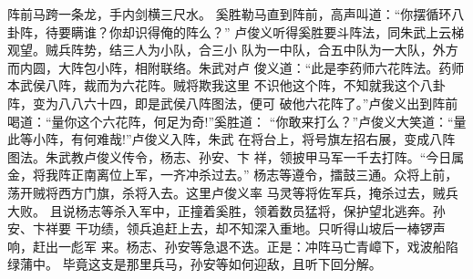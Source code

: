 阵前马跨一条龙，手内剑横三尺水。
奚胜勒马直到阵前，高声叫道：“你摆循环八卦阵，待要瞒谁？你却识得俺的阵么？”
卢俊义听得奚胜要斗阵法，同朱武上云梯观望。贼兵阵势，结三人为小队，合三小
队为一中队，合五中队为一大队，外方而内圆，大阵包小阵，相附联络。朱武对卢
俊义道：“此是李药师六花阵法。药师本武侯八阵，裁而为六花阵。贼将欺我这里
不识他这个阵，不知就我这个八卦阵，变为八八六十四，即是武侯八阵图法，便可
破他六花阵了。”卢俊义出到阵前喝道：“量你这个六花阵，何足为奇!”奚胜道：
“你敢来打么？”卢俊义大笑道：“量此等小阵，有何难哉!”卢俊义入阵，朱武
在将台上，将号旗左招右展，变成八阵图法。朱武教卢俊义传令，杨志、孙安、卞
祥，领披甲马军一千去打阵。“今日属金，将我阵正南离位上军，一齐冲杀过去。”
杨志等遵令，擂鼓三通。众将上前，荡开贼将西方门旗，杀将入去。这里卢俊义率
马灵等将佐军兵，掩杀过去，贼兵大败。
且说杨志等杀入军中，正撞着奚胜，领着数员猛将，保护望北逃奔。孙安、卞祥要
干功绩，领兵追赶上去，却不知深入重地。只听得山坡后一棒锣声响，赶出一彪军
来。杨志、孙安等急退不迭。正是：冲阵马亡青嶂下，戏波船陷绿蒲中。
毕竟这支是那里兵马，孙安等如何迎敌，且听下回分解。